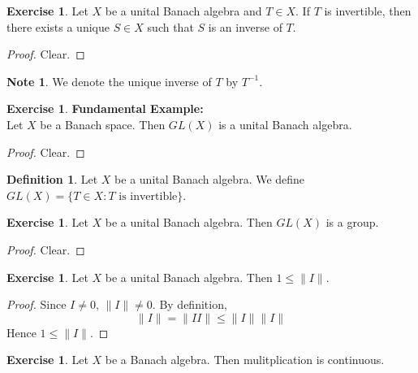 \documentclass[12pt]{amsart}
\theoremstyle{definition}
\newtheorem{defn}[definition]{Definition}
\newtheorem{note}[definition]{Note}
\newtheorem{ex}[definition]{Exercise}
\newcommand{\lex}[1]{\label{ex:#1}}
\newcommand{\ld}[1]{\label{defn:#1}}
\begin{document}
		\begin{ex} \lex{}
		Let $X$ be a unital Banach algebra and $T \in X$. If $T$ is invertible, then there exists a unique $S \in X$ such that $S$ is an inverse of $T$.
		\end{ex}
		
		\begin{proof}
		Clear.
		\end{proof}
		
		\begin{note}
		We denote the unique inverse of $T$ by $T^{-1}$.
		\end{note}
		
			
	\begin{ex} \lex{}\textbf{Fundamental Example:} \\
	Let $X$ be a Banach space. Then $GL(X)$ is a unital Banach algebra.
	\end{ex}
	
	\begin{proof}
	Clear.
	\end{proof}
		
		\begin{defn} \ld{}
		Let $X$ be a unital Banach algebra. We define $GL(X) = \{T \in X: T \text{ is invertible}\}$.
		\end{defn}
		
		\begin{ex} \lex{}
		Let $X$ be a unital Banach algebra. Then $GL(X)$ is a group.  
	\end{ex}
	
	\begin{proof}
	Clear.
	\end{proof}
	
	\begin{ex} \lex{}
		Let $X$ be a unital Banach algebra. Then $1 \leq \|I \|$. 
	\end{ex}
	
	\begin{proof}
		Since $I \neq 0$, $\|I \|\neq 0$. By definition, $$\|I \|= \|I I \|\leq \|I \|\|I \|$$ Hence $1 \leq \|I \|$.
	\end{proof}
	
	\begin{ex} \lex{}
		Let $X$ be a Banach algebra. Then mulitplication is continuous. 
	\end{ex}
	
\end{document}
